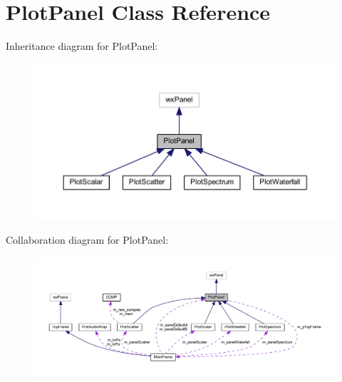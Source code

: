 \hypertarget{class_plot_panel}{\section{Plot\-Panel Class Reference}
\label{class_plot_panel}
}


Inheritance diagram for Plot\-Panel\-:\nopagebreak
\begin{figure}[H]
\begin{center}
\leavevmode
\includegraphics[width=350pt]{class_plot_panel__inherit__graph}
\end{center}
\end{figure}


Collaboration diagram for Plot\-Panel\-:\nopagebreak
\begin{figure}[H]
\begin{center}
\leavevmode
\includegraphics[width=350pt]{class_plot_panel__coll__graph}
\end{center}
\end{figure}
